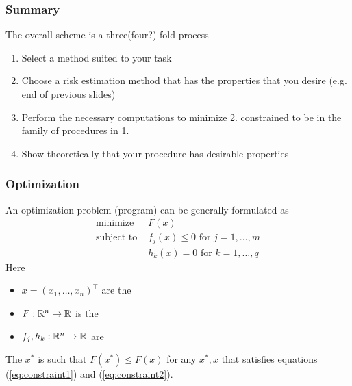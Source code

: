 \documentclass{beamer}
\begin{document}
\title{}
\subtitle{\classTitle}
\date{}



\begin{frame}
\maketitle
%
\organization
%
\end{frame}

\begin{frame}[fragile]
\frametitle{Summary}
The overall scheme is a three(four?)-fold process
\begin{enumerate}
\item Select a method suited to your task
\item Choose a risk estimation method that has the properties that you desire (e.g. end of previous slides)
\item \textcolor<2>{redmain}{Perform the necessary computations to minimize \textcolor{bluemain}{2.} constrained
to be in the family of procedures in \textcolor{bluemain}{1.}}
\item Show theoretically that your procedure has desirable properties
\end{enumerate}
\end{frame}




\begin{frame}[fragile]
\frametitle{Optimization}
An optimization problem (program) can be generally formulated as
\begin{align}
\textrm{minimize } & F(x) \\
\label{eq:constraint1}
\textrm{subject to } 
& f_j(x) \leq 0 \textrm{ for }  j = 1, \ldots, m \\
\label{eq:constraint2}
& h_k(x) = 0 \textrm{ for }  k = 1, \ldots, q
\end{align}
Here
\begin{itemize}
\item[] $x = (x_1, \ldots, x_n)^{\top}$ are the 
\item[] $F:\mathbb{R}^n \rightarrow \mathbb{R}$ is the 
\item[] $f_j,h_k:\mathbb{R}^n \rightarrow \mathbb{R}$ are 
\end{itemize}

\vsp
The  $x^*$ is such that $F(x^*) \leq F(x)$ for any $x^*,x$ that satisfies equations (\ref{eq:constraint1}) and (\ref{eq:constraint2}).
\end{frame}
\end{document}
